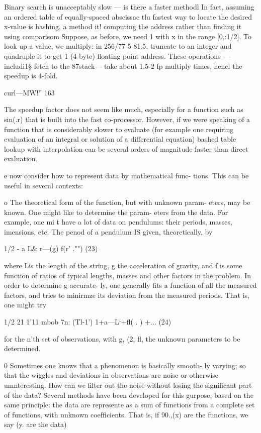  

Binary search is unacceptably slow — is there a faster methodl
In fact, assuming an ordered table of equally-spaced abscissae tlu
fastest way to locate the desired x-value is hashing, a method it!
computing the address rather than ﬁnding it using comparisom
Suppose, as before, we need 1%
with x in the range [0,:1/2]. To look up a value, we multiply: in
256/77 5 81.5, truncate to an integer and quadruple it to get 1
(4-byte) ﬂoating point address. These operations —includi1§
fetch to the 87stack— take about 1.5-2 fp multiply times, hencl
the speedup is 4-fold.

curl—MW!” 163

The speedup factor does not seem like much, especially for a
function such as sin(.r) that is built into the fast co-processor.
However, if we were speaking of a function that is considerably
slower to evaluate (for example one requiring evaluation of an
integral or solution of a differential equation) bashed table
lookup with interpolation can be several orders of magnitude
faster than direct evaluation.

e now consider how to represent data by mathematical func-
tions. This can be useful in several contexts:

o The theoretical form of the function, but with unknown param-
eters, may be known. One might like to determine the param-
eters from the data. For example, one mi t have a lot of data
on pendulums: their periods, masses, imensions, etc. The
penod of a pendulum IS given, theoretically, by

1/2
- a L&
r—(g) f(r’ ."") (23)

where Lis the length of the string, g the acceleration of gravity,
and f is some function of ratios of typical lengths, masses and
other factors in the problem. In order to determine g accurate-
ly, one generally ﬁts a function of all the measured factors, and
tries to minirmze its deviation from the measured periods.
That is, one might try

1/2
21 1'11 mbob
7n: (Tl-1') 1+a—L‘+ﬂ( . ) +... (24)

for the n'th set of observations, with g, (2, ﬂ, the unknown
parameters to be determined.

0 Sometimes one knows that a phenomenon is basically smooth-
ly varying; so that the wiggles and deviations in observations
are noise or otherwise umnteresting. How can we ﬁlter out the
noise without losing the signiﬁcant part of the data? Several
methods have been developed for this gurpose, based on the
same principle: the data are represente as a sum of functions
from a complete set of functions, with unknown coefﬁcients.
That is, if 90.,(x) are the functions, we say (y. are the data)


